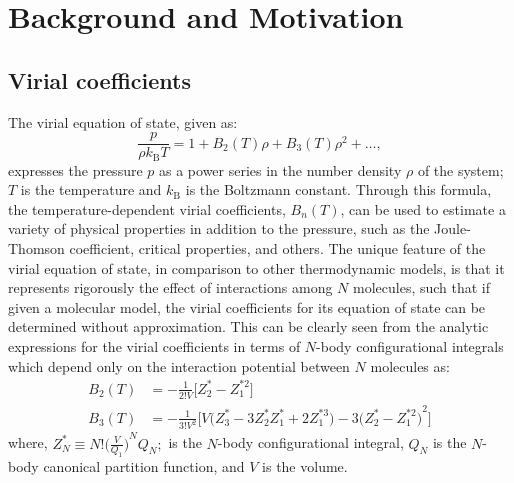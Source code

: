 \chapter{Background and Motivation} \label{chap:background and motivation}
    \section{Virial coefficients}
    \label{sec:chap1VirialCoefficients}
        The virial equation of state, given as:
        \begin{equation}
          \frac{p}{\rho k_\text{B}T} = 1 + B_2(T) \rho + B_3(T) \rho^2 + \ldots,
        \end{equation}
        expresses the pressure $p$ as a power series in the number density $\rho$ of the system; $T$ is the temperature and $k_\textrm{B}$ is the Boltzmann constant. Through this formula, the temperature-dependent virial coefficients, $B_n(T)$, can be used to estimate a variety of physical properties in addition to the pressure, such as the Joule-Thomson coefficient,  critical properties, and others. The unique feature of the virial equation of state, in comparison to other thermodynamic models, is that it represents rigorously the effect of interactions among $N$ molecules, such that if given a molecular model, the virial coefficients for its equation of state can be determined without approximation. This can be clearly seen from the analytic expressions for the virial coefficients in terms of $N$-body configurational integrals \cite{Tester} which depend only on the interaction potential between $N$ molecules as:
        \begin{equation}\label{eq: bn}
            \begin{aligned}
                B_2(T) &= - \frac{1}{2! {V}}  \Big[ Z_2^* - Z_1^{*2} \Big]\\
                B_3(T) &= - \frac{1}{3! {V}^2}  \Big[ {V}  \big( Z_3^* - 3  Z_2^*  Z_1^* + 2  Z_1^{*3} \big) - 3  {\big( Z_2^* - Z_1^{*2} \big)}^2 \Big]
            \end{aligned}
        \end{equation}
        where, $ Z_N^* \equiv N!  {\Big( \displaystyle\frac{{V}}{Q_1} \Big)}^N  Q_N ;$ is the $N$-body configurational integral, $Q_N$ is the $N$-body canonical partition function, and ${V}$ is the volume.

